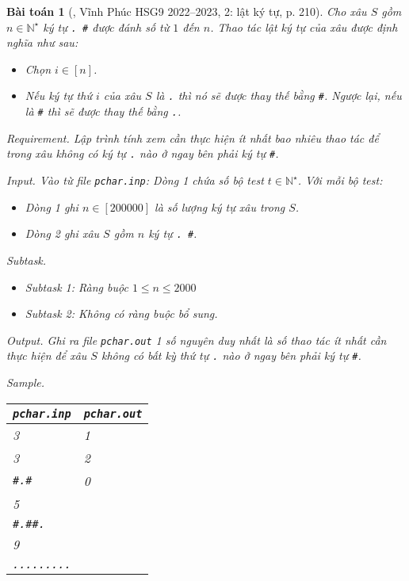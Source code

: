 \documentclass{article}
\newtheorem{baitoan}{Bài toán}
\begin{document}
\begin{baitoan}[\cite{Trung_THCS_Tin}, Vĩnh Phúc HSG9 2022--2023, 2: lật ký tự, p. 210]
	Cho xâu $S$ gồm $n\in\mathbb{N}^\star$ ký tự \verb|. #| được đánh số từ $1$ đến $n$. Thao tác lật ký tự của xâu được định nghĩa như sau:
	\begin{itemize}
		\item Chọn $i\in[n]$.
		\item Nếu ký tự thứ $i$ của xâu $S$ là \verb|.| thì nó sẽ được thay thế bằng \verb|#|. Ngược lại, nếu là \verb|#| thì sẽ được thay thế bằng \verb|.|.
	\end{itemize}
	\item {\sf Requirement.} Lập trình tính xem cần thực hiện ít nhất bao nhiêu thao tác để trong xâu không có ký tự \verb|.| nào ở ngay bên phải ký tự \verb|#|.
	\item {\sf Input.} Vào từ file {\tt pchar.inp}: Dòng 1 chứa số bộ test $t\in\mathbb{N}^\star$. Với mỗi bộ test:
	\begin{itemize}
		\item Dòng 1 ghi $n\in[200000]$ là số lượng ký tự xâu trong $S$.
		\item Dòng 2 ghi xâu $S$ gồm $n$ ký tự \verb|. #|.
	\end{itemize}
	\item {\sf Subtask.}
	\begin{itemize}
		\item Subtask 1: Ràng buộc $1\le n\le2000$
		\item Subtask 2: Không có ràng buộc bổ sung.
	\end{itemize}
	\item {\sf Output.} Ghi ra file {\tt pchar.out} 1 số nguyên duy nhất là số thao tác ít nhất cần thực hiện để xâu $S$ không có bất kỳ thứ tự \verb|.| nào ở ngay bên phải ký tự \verb|#|.
	\item {\sf Sample.}
	\begin{table}[H]
		\centering
		\begin{tabular}{|l|l|}
			\hline
			{\tt pchar.inp} & {\tt pchar.out} \\
			\hline
			3 & 1 \\
			3 & 2 \\
			\verb|#.#| & 0 \\
			5 & \\
			\verb|#.##.| & \\
			9 & \\
			\verb|.........| & \\
			\hline
		\end{tabular}
	\end{table}
\end{baitoan}
\end{document}
